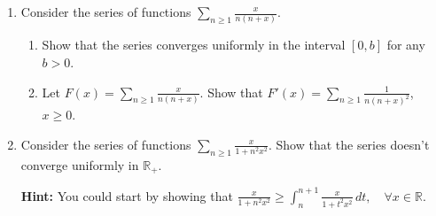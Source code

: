 \documentclass{article}
\begin{document}
\begin{enumerate}
\item Consider the series of functions $\sum_{n\geq 1}^{} \frac{x}{n(n+x)}$.
  \begin{enumerate}
    \item Show that the series converges uniformly in the interval $[0,b]$ for any $b>0$.

    \item Let $F(x)=\sum_{n\geq 1}^{} \frac{x}{n(n+x)}$. Show that $F'(x)=\sum_{n\geq 1}^{} \frac{1}{n(n+x)^2}$, $x\geq 0$.

  \end{enumerate}
\item Consider the series of functions $\sum_{n\geq 1}^{} \frac{x}{1+n^2x^2}$. Show that the series doesn't converge uniformly in $\mathbb{R}_+$.

  \textbf{Hint:} You could start by showing that $\frac{x}{1+n^2x^2}\geq \int_{n}^{n+1} \frac{x}{1+t^2x^2} \, d t, \quad \forall x\in \mathbb{R}$.
\end{enumerate}
\end{document}
